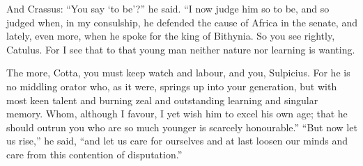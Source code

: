  And Crassus: ``You say `to be'?'' he said. ``I now judge him so to be, and so judged when, in my consulship, he defended the cause of Africa in the senate, and lately, even more, when he spoke for the king of Bithynia. So you see rightly, Catulus. For I see that to that young man neither nature nor learning is wanting.

 The more, Cotta, you must keep watch and labour, and you, Sulpicius. For he is no middling orator who, as it were, springs up into your generation, but with most keen talent and burning zeal and outstanding learning and singular memory. Whom, although I favour, I yet wish him to excel his own age; that he should outrun you who are so much younger is scarcely honourable.'' ``But now let us rise,'' he said, ``and let us care for ourselves and at last loosen our minds and care from this contention of disputation.''

